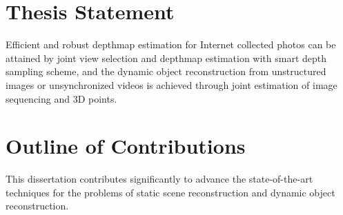 \section{Thesis Statement}
Efficient and robust depthmap estimation for Internet collected photos can be attained by joint view selection and depthmap estimation with smart depth sampling scheme, and the dynamic object reconstruction from unstructured images or unsynchronized videos is achieved through joint estimation of image sequencing and 3D points.

\section{Outline of Contributions}
This dissertation contributes significantly to advance the state-of-the-art techniques for the problems of static scene reconstruction and dynamic object reconstruction. 

